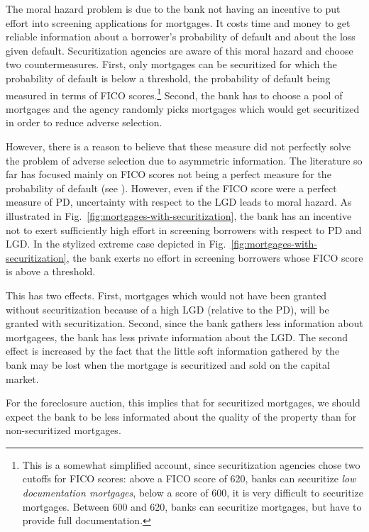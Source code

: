 \documentclass[11pt,twopage]{article}
\begin{document}
The moral hazard problem is due to the bank not having an incentive to
put effort into screening applications for mortgages. It costs time
and money to get reliable information about a borrower's probability
of default and about the loss given default.
Securitization agencies
are aware of this moral hazard and choose two countermeasures. First,
only mortgages can be securitized for which the probability of default
is below a threshold, the probability of default being measured in
terms of FICO scores.\footnote{This is a somewhat simplified account,
	since securitization agencies chose two cutoffs for FICO scores:
	above a FICO score of 620, banks can securitize \emph{low
		documentation mortgages}, below a score of 600, it is very
	difficult to securitize mortgages. Between 600 and 620, banks can
	securitize mortgages, but have to provide full documentation.}
Second, the bank has to choose a pool of mortgages and the agency
randomly picks mortgages which would get securitized in order to reduce adverse selection.

However, there is a reason to believe that these measure did not
perfectly solve the problem of adverse selection due to asymmetric information. The literature
so far has focused mainly on FICO scores not being a perfect measure for
the probability of default (see \cite{keys2008did}). However, even
if the FICO score were a perfect measure of PD, uncertainty with
respect to the LGD leads to moral hazard.  As illustrated in Fig.~\ref{fig:mortgages-with-securitization}, the bank has an incentive not to exert sufficiently high
effort in screening borrowers with respect to PD and LGD. In the
stylized extreme case depicted in Fig.~\ref{fig:mortgages-with-securitization}, the bank exerts no
effort in screening borrowers whose FICO score is above a
threshold.

This has two effects. First, mortgages which would not have been
granted without securitization because of a high LGD (relative to the
PD), will be granted with securitization. Second, since the bank
gathers less information about mortgagees, the bank has less private
information about the LGD. The second effect is increased by the fact
that the little soft information gathered by the bank may be lost when
the mortgage is securitized and sold on the capital market.

For the foreclosure auction, this implies that for securitized mortgages, we should expect the bank to be less informated about the quality of the property than for non-securitized mortgages.
\end{document}
